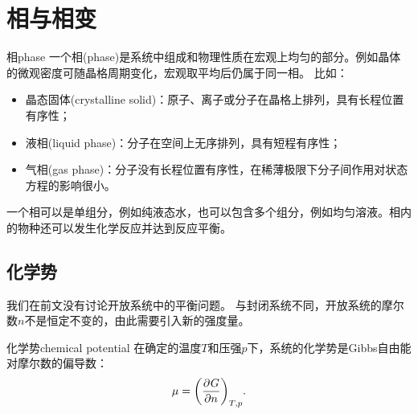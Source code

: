 \chapter{相与相变}
\label{chap:phase}

\begin{definition}
	{相}{phase}
	一个相(phase)是系统中组成和物理性质在宏观上均匀的部分。例如晶体的微观密度可随晶格周期变化，宏观取平均后仍属于同一相。
	比如：
	\begin{itemize}
		\item 晶态固体(crystalline solid)：原子、离子或分子在晶格上排列，具有长程位置有序性；
		\item 液相(liquid phase)：分子在空间上无序排列，具有短程有序性；
		\item 气相(gas phase)：分子没有长程位置有序性，在稀薄极限下分子间作用对状态方程的影响很小。
	\end{itemize}
\end{definition}

\begin{remark}
	一个相可以是单组分，例如纯液态水，也可以包含多个组分，例如均匀溶液。相内的物种还可以发生化学反应并达到反应平衡。
\end{remark}


\section{化学势}
\label{sec:chemical potential}

我们在前文没有讨论开放系统中的平衡问题。
与封闭系统不同，开放系统的摩尔数$n$不是恒定不变的，由此需要引入新的强度量。

\begin{definition}
	{化学势}{chemical potential}
	在确定的温度$T$和压强$p$下，系统的化学势是Gibbs自由能对摩尔数的偏导数：
	\begin{equation}
		\mu = \biggl(\frac{\partial^{}G}{\partial{n}^{}}\biggr)_{T,p}.
	\end{equation}
\end{definition}

